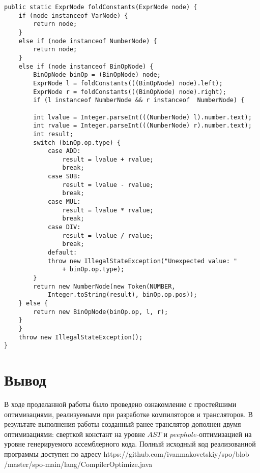 \begin{Verbatim}
public static ExprNode foldConstants(ExprNode node) {
	if (node instanceof VarNode) {
		return node;
	}
	else if (node instanceof NumberNode) {
		return node;
	}
	else if (node instanceof BinOpNode) {
		BinOpNode binOp = (BinOpNode) node;
		ExprNode l = foldConstants(((BinOpNode) node).left);
		ExprNode r = foldConstants(((BinOpNode) node).right);
		if (l instanceof NumberNode && r instanceof  NumberNode) {

		int lvalue = Integer.parseInt(((NumberNode) l).number.text);
		int rvalue = Integer.parseInt(((NumberNode) r).number.text);
		int result;
		switch (binOp.op.type) {
			case ADD:
				result = lvalue + rvalue;
				break;
			case SUB:
				result = lvalue - rvalue;
				break;
			case MUL:
				result = lvalue * rvalue;
				break;
			case DIV:
				result = lvalue / rvalue;
				break;
			default:
			throw new IllegalStateException("Unexpected value: "
				+ binOp.op.type);
		}
		return new NumberNode(new Token(NUMBER, 
			Integer.toString(result), binOp.op.pos));
	} else {
		return new BinOpNode(binOp.op, l, r);
	}
	}
	throw new IllegalStateException();
}

\end{Verbatim}

\section{Вывод}
В ходе проделанной работы было проведено ознакомление с простейшими оптимизациями, реализуемыми при разработке компиляторов и трансляторов. В результате выполнения работы созданный ранее транслятор дополнен двумя оптимизациями: сверткой констант на уровне $AST$ и $peephole$-оптимизацией на уровне генерируемого ассемблерного кода. Полный исходный код реализованной программы доступен по адресу https://github.com/ivanmakovetskiy/spo/blob\\/master/spo-main/lang/CompilerOptimize.java
